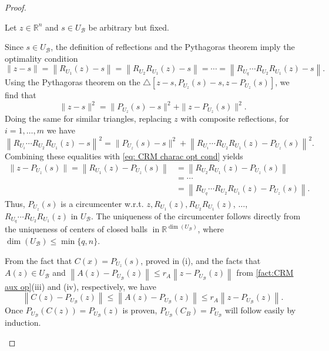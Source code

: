 \documentclass[smallextended,numbook,nospthms]{svjour3}
\theoremstyle{plain}
\theoremstyle{definition}
\def\RR{\mathds R}
\begin{document}
\begin{proof}
	\begin{listi}
		\item Let $z \in \RR^{n}$ and $s \in U_{\mathcal{B}}$ be arbitrary but fixed. 
		
		Since $s \in U_{\mathcal{B}}$, the definition of reflections and the Pythagoras theorem imply the optimality condition
		\begin{equation}
			\|z-s\|=\left\|R_{U_{1}}(z)-s\right\|=\left\|R_{U_{2}} R_{U_{1}}(z)-s\right\|=\cdots=\left\|R_{U_{q}} \cdots R_{U_{2}} R_{U_{1}}(z)-s\right\|. \label{eq: CRM charac opt cond}
		\end{equation}
		Using the Pythagoras theorem on the $\triangle[z-s,P_{U_{z}}(s)-s,z-P_{U_{z}}(s)]$, we find that
		\[
		\|z-s\|^{2} =\|P_{U_{z}}(s)-s\|^{2}+\|z-P_{U_{z}}(s)\|^{2}.
		\]
		Doing the same for similar triangles, replacing $z$ with composite reflections, for $i=1, \ldots, m$ we have
		\[
		\left\|R_{U_{i}} \cdots R_{U_{2}} R_{U_{1}}(z)-s\right\|^{2} =\|P_{U_{z}}(s)-s\|^{2}+\left\|R_{U_{i}} \cdots R_{U_{2}} R_{U_{1}}(z)-P_{U_{z}}(s)\right\|^{2}.
		\]
		Combining these equalities with \cref{eq: CRM charac opt cond} yields
		\begin{align}
			\|z-P_{U_{z}}(s)\|=\left\|R_{U_{1}}(z)-P_{U_{z}}(s)\right\|&=\left\|R_{U_{2}} R_{U_{1}}(z)-P_{U_{z}}(s)\right\| \\
			&=\cdots \\
			&=\left\|R_{U_{q}} \cdots R_{U_{2}} R_{U_{1}}(z)-P_{U_{z}}(s)\right\|.	
		\end{align}
		Thus, $P_{U_{z}}(s)$ is a circumcenter w.r.t. $z, R_{U_{1}}(z), R_{U_{2}} R_{U_{1}}(z)$, $\ldots$, $R_{U_{q}} \cdots R_{U_{2}} R_{U_{1}}(z)$ in $U_{\mathcal{B}}$.
		The uniqueness of the circumcenter follows directly from the uniqueness of centers of closed balls $\operatorname{in} \RR^{\operatorname{dim}\left(U_{\mathcal{B}}\right)}$, where $\operatorname{dim}\left(U_{\mathcal{B}}\right) \leq \min \{q, n\}$.
		
		\item From the fact that $C(x)=P_{U_z}(s)$, proved in (i), and the facts that $A(z) \in U_{\mathcal{B}}$ and $\left\|A(z)-P_{U_{\mathcal{B}}}(z)\right\| \leq r_{A}\left\|z-P_{U_{\mathcal{B}}}(z)\right\|$ from \cref{fact:CRM aux op}(iii) and (iv), respectively, we have
		\[
		\left\|C(z)-P_{U_{\mathcal{B}}}(z)\right\| \leq\left\|A(z)-P_{U_{\mathcal{B}}}(z)\right\| \leq r_{A}\left\|z-P_{U_{\mathcal{B}}}(z)\right\|.
		\]
		Once $P_{U_{\mathcal{B}}}(C(z))=P_{U_{\mathcal{B}}}(z)$ is proven, $P_{U_{\mathcal{B}}}\left(C_B\right)=P_{U_\mathcal{B}}$ will follow easily by induction. 
		

\end{listi}
\end{proof}
\end{document}
